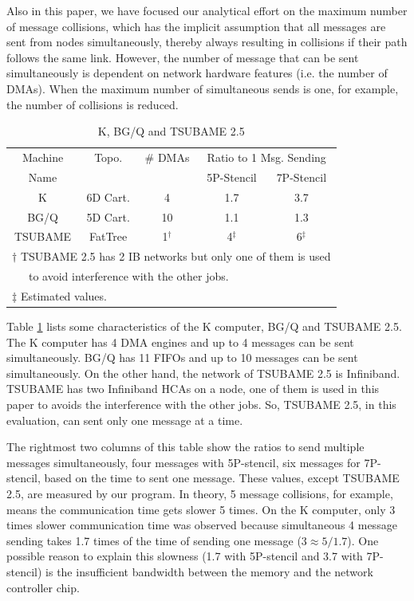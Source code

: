 \documentclass[Afour,times,sagev]{sagej}
\begin{document}
Also in this paper, we have focused our analytical effort on the
maximum number of message collisions, which has the implicit
assumption that all messages are sent from nodes simultaneously,
thereby always resulting in collisions if their path follows the same
link. However, the number of message that can be sent simultaneously
is dependent on network hardware features (i.e. the number of
DMAs). When the maximum number of simultaneous sends is one, for
example, the number of collisions is reduced.

\begin{table}[htb]
\centering
\caption{K, BG/Q and TSUBAME 2.5}
\label{tbl:machines}
{\small
\begin{tabular}{c|c|c|c|c}
\hline
Machine & Topo. & \# DMAs &\multicolumn{2}{c}{Ratio to 1 Msg. Sending}\\
Name & &  & 5P-Stencil & 7P-Stencil \\
\hline
K & 6D Cart. & 4 & 1.7 & 3.7 \\
BG/Q\cite{Chen:2011:IBG:2063384.2063419} & 5D Cart. & 10 & 1.1 & 1.3 \\
TSUBAME & FatTree & 1$^{\dagger}$ & 4$^{\ddagger}$ & 6$^{\ddagger}$ \\
\hline
\multicolumn{5}{l}{\footnotesize $\dagger$ TSUBAME 2.5 has 2 IB
  networks but only one of them is used} \\
\multicolumn{5}{l}{\footnotesize ~~~to avoid
  interference with the other jobs.} \\
\multicolumn{5}{l}{\footnotesize $\ddagger$ Estimated values.} \\
\end{tabular}
}
\end{table}

Table \ref{tbl:machines} lists some characteristics of the K computer,
BG/Q and TSUBAME 2.5. The K computer has 4 DMA engines and up to 4
messages can be sent simultaneously. BG/Q has 11 FIFOs and up to 10
messages can be sent simultaneously. On the other hand, the network of
TSUBAME 2.5 is Infiniband\cite{infiniband}. TSUBAME has two
Infiniband HCAs on a node, one of them is used in this paper to avoids
the interference with the other jobs. So, TSUBAME 2.5, in this
evaluation, can sent only one message at a time. 

The rightmost two columns of this table show the ratios to send
multiple messages simultaneously, four messages with 5P-stencil, six
messages for 7P-stencil, based on the time to sent one message. These
values, except TSUBAME 2.5, are measured by our program. In
theory, 5 message collisions, for example, means the communication
time gets slower 5 times. On the K computer, only 3 times
slower communication time was observed because simultaneous 4 message
sending takes 1.7 times of the time of sending one message ($3 \approx
5/1.7$)\cite{Hori-EuroMPI2015}. One possible reason to explain this
slowness (1.7 with 5P-stencil and 3.7 with 7P-stencil) is the
insufficient bandwidth between the memory and the network controller
chip. 
\end{document}
